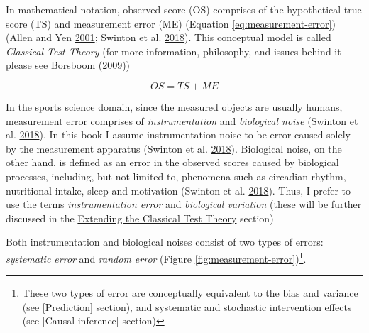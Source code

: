 \documentclass[
]{book}
\begin{document}
In mathematical notation, observed score (OS) comprises of the hypothetical true score (TS) and measurement error (ME) (Equation \eqref{eq:measurement-error}) (Allen and Yen \protect\hyperlink{ref-allenIntroductionMeasurementTheory2001}{2001}; Swinton et al. \protect\hyperlink{ref-swintonStatisticalFrameworkInterpret2018}{2018}). This conceptual model is called \emph{Classical Test Theory} (for more information, philosophy, and issues behind it please see Borsboom (\protect\hyperlink{ref-borsboomMeasuringMindConceptual2009}{2009}))

\begin{equation}
  OS = TS + ME
  \label{eq:measurement-error}
\end{equation}

In the sports science domain, since the measured objects are usually humans, measurement error comprises of \emph{instrumentation} and \emph{biological noise} (Swinton et al. \protect\hyperlink{ref-swintonStatisticalFrameworkInterpret2018}{2018}). In this book I assume instrumentation noise to be error caused solely by the measurement apparatus (Swinton et al. \protect\hyperlink{ref-swintonStatisticalFrameworkInterpret2018}{2018}). Biological noise, on the other hand, is defined as an error in the observed scores caused by biological processes, including, but not limited to, phenomena such as circadian rhythm, nutritional intake, sleep and motivation (Swinton et al. \protect\hyperlink{ref-swintonStatisticalFrameworkInterpret2018}{2018}). Thus, I prefer to use the terms \emph{instrumentation error} and \emph{biological variation} (these will be further discussed in the \protect\hyperlink{extending-the-classical-test-theory}{Extending the Classical Test Theory} section)

Both instrumentation and biological noises consist of two types of errors: \emph{systematic error} and \emph{random error} (Figure \ref{fig:measurement-error})\footnote{These two types of error are conceptually equivalent to the bias and variance (see {[}Prediction{]} section), and systematic and stochastic intervention effects (see {[}Causal inference{]} section)}.
\end{document}
